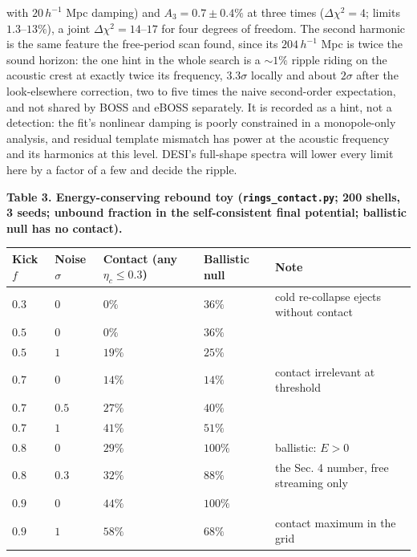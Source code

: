 \documentclass[
  11pt,
]{article}
\begin{document}
with \(20\,h^{-1}\) Mpc damping) and \(A_3 = 0.7 \pm 0.4\%\) at three
times (\(\Delta\chi^2 = 4\); limits \(1.3\)--\(13\%\)), a joint
\(\Delta\chi^2 = 14\)--\(17\) for four degrees of freedom. The second
harmonic is the same feature the free-period scan found, since its
\(204\,h^{-1}\) Mpc is twice the sound horizon: the one hint in the
whole search is a \(\sim 1\%\) ripple riding on the acoustic crest at
exactly twice its frequency, \(3.3\sigma\) locally and about \(2\sigma\)
after the look-elsewhere correction, two to five times the naive
second-order expectation, and not shared by BOSS and eBOSS separately.
It is recorded as a hint, not a detection: the fit's nonlinear damping
is poorly constrained in a monopole-only analysis, and residual template
mismatch has power at the acoustic frequency and its harmonics at this
level. DESI's full-shape spectra will lower every limit here by a factor
of a few and decide the ripple.

\textbf{Table 3. Energy-conserving rebound toy
(\texttt{rings\_contact.py}; 200 shells, 3 seeds; unbound fraction in
the self-consistent final potential; ballistic null has no contact).}

\begin{longtable}[]{@{}lllll@{}}
\toprule
Kick \(f\) & Noise \(\sigma\) & Contact (any \(\eta_c \le 0.3\)) &
Ballistic null & Note\tabularnewline
\midrule
\endhead
\(0.3\) & \(0\) & \(0\%\) & \(36\%\) & cold re-collapse ejects without
contact\tabularnewline
\(0.5\) & \(0\) & \(0\%\) & \(36\%\) &\tabularnewline
\(0.5\) & \(1\) & \(19\%\) & \(25\%\) &\tabularnewline
\(0.7\) & \(0\) & \(14\%\) & \(14\%\) & contact irrelevant at
threshold\tabularnewline
\(0.7\) & \(0.5\) & \(27\%\) & \(40\%\) &\tabularnewline
\(0.7\) & \(1\) & \(41\%\) & \(51\%\) &\tabularnewline
\(0.8\) & \(0\) & \(29\%\) & \(100\%\) & ballistic:
\(E > 0\)\tabularnewline
\(0.8\) & \(0.3\) & \(32\%\) & \(88\%\) & the Sec. 4 number, free
streaming only\tabularnewline
\(0.9\) & \(0\) & \(44\%\) & \(100\%\) &\tabularnewline
\(0.9\) & \(1\) & \(58\%\) & \(68\%\) & contact maximum in the
grid\tabularnewline
\bottomrule
\end{longtable}
\end{document}
